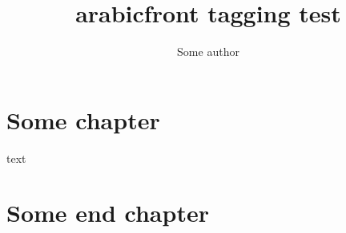 \documentclass{book}
\title{arabicfront tagging test}
\author{Some author}
\begin{document}
\frontmatter
\maketitle
\tableofcontents

\mainmatter
\chapter{Some chapter}
text

\backmatter
\chapter{Some end chapter}
\end{document}
